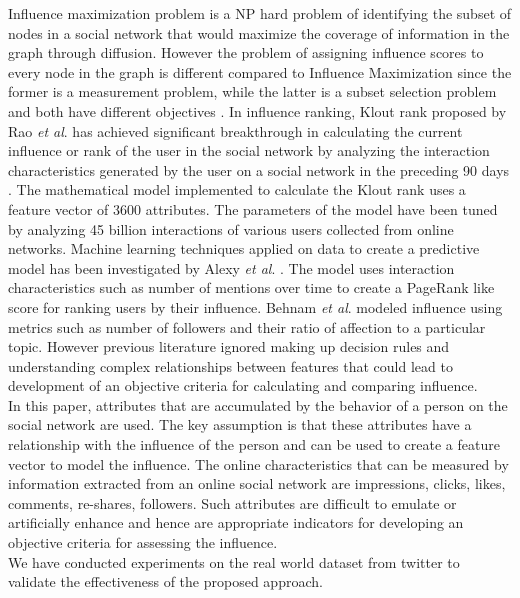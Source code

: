 Influence maximization problem is a NP hard problem of identifying the subset of nodes in a social network that would maximize the coverage of information in the graph through diffusion. However the problem of assigning influence scores to every node in the graph is different compared to Influence Maximization since the former is a measurement problem, while the latter is a subset selection problem and both have different objectives \cite{aps:12} \cite{aps:13}. In influence ranking, Klout rank proposed by Rao \textit{et al}. has achieved significant breakthrough in calculating the current influence or rank of the user in the social network by analyzing the interaction characteristics generated by the user on a social network in the preceding 90 days \cite{aps:14}. The mathematical model implemented to calculate the Klout rank uses a feature vector of 3600 attributes.  The parameters of the model have been tuned by analyzing 45 billion interactions of various users collected from online networks. Machine learning techniques applied on data to create a predictive model has been investigated by Alexy \textit{et al}. \cite{aps:19} \cite{aps:17}. The model uses interaction characteristics such as number of mentions over time to create a PageRank like score for ranking users by their influence. Behnam \textit{et al}. \cite{aps:18} modeled influence using metrics such as number of followers and their ratio of affection to a particular topic. However previous literature ignored making up decision rules and understanding complex relationships between features that could lead to development of an objective criteria for calculating and comparing influence.\\


In this paper, attributes that are accumulated by the behavior of a person on the social network are used. The key assumption is that these attributes have a relationship with the influence of the person and can be used to create a feature vector to model the influence. The online characteristics that can be measured by information extracted from an online social network are impressions, clicks, likes, comments, re-shares, followers. Such attributes are difficult to emulate or artificially enhance and hence are appropriate indicators for developing an objective criteria for assessing the influence.\\

We have conducted experiments on the real world dataset from twitter to validate the effectiveness of the proposed approach. \\

